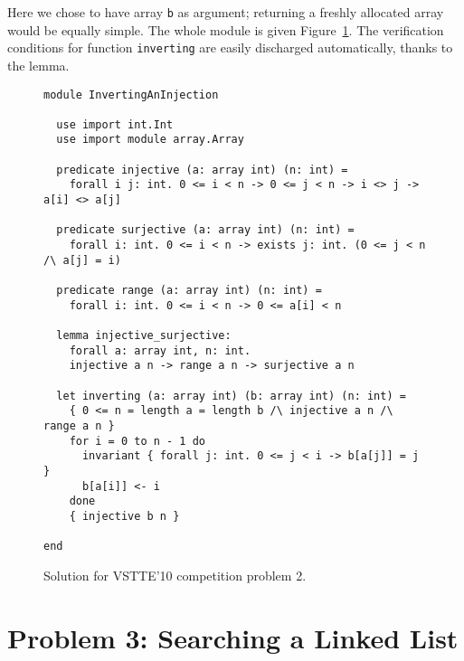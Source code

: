 Here we chose to have array \texttt{b} as argument; returning a
freshly allocated array would be equally simple.
The whole module is given Figure~\ref{fig:Inverting}.
The verification conditions for function \texttt{inverting} are easily
discharged automatically, thanks to the lemma.
\begin{figure}
  \centering
\begin{verbatim}
module InvertingAnInjection

  use import int.Int
  use import module array.Array

  predicate injective (a: array int) (n: int) =
    forall i j: int. 0 <= i < n -> 0 <= j < n -> i <> j -> a[i] <> a[j]

  predicate surjective (a: array int) (n: int) =
    forall i: int. 0 <= i < n -> exists j: int. (0 <= j < n /\ a[j] = i)

  predicate range (a: array int) (n: int) =
    forall i: int. 0 <= i < n -> 0 <= a[i] < n

  lemma injective_surjective:
    forall a: array int, n: int.
    injective a n -> range a n -> surjective a n

  let inverting (a: array int) (b: array int) (n: int) =
    { 0 <= n = length a = length b /\ injective a n /\ range a n }
    for i = 0 to n - 1 do
      invariant { forall j: int. 0 <= j < i -> b[a[j]] = j }
      b[a[i]] <- i
    done
    { injective b n }

end
\end{verbatim}
\vspace*{-2em}\hrulefill
  \caption{Solution for VSTTE'10 competition problem 2.}
  \label{fig:Inverting}
\end{figure}

\section{Problem 3: Searching a Linked List}

